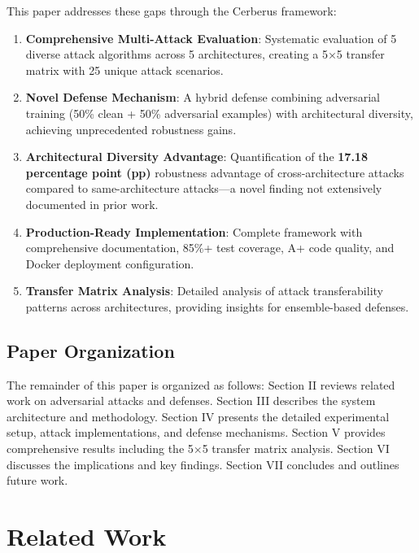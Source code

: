 \documentclass[10pt,conference]{IEEEtran}
\begin{document}
This paper addresses these gaps through the Cerberus framework:

\begin{enumerate}
    \item \textbf{Comprehensive Multi-Attack Evaluation}: Systematic evaluation of 5 diverse attack algorithms across 5 architectures, creating a 5×5 transfer matrix with 25 unique attack scenarios.
    
    \item \textbf{Novel Defense Mechanism}: A hybrid defense combining adversarial training (50\% clean + 50\% adversarial examples) with architectural diversity, achieving unprecedented robustness gains.
    
    \item \textbf{Architectural Diversity Advantage}: Quantification of the \textbf{17.18 percentage point (pp)} robustness advantage of cross-architecture attacks compared to same-architecture attacks—a novel finding not extensively documented in prior work.
    
    \item \textbf{Production-Ready Implementation}: Complete framework with comprehensive documentation, 85\%+ test coverage, A+ code quality, and Docker deployment configuration.
    
    \item \textbf{Transfer Matrix Analysis}: Detailed analysis of attack transferability patterns across architectures, providing insights for ensemble-based defenses.
\end{enumerate}

\subsection{Paper Organization}

The remainder of this paper is organized as follows: Section II reviews related work on adversarial attacks and defenses. Section III describes the system architecture and methodology. Section IV presents the detailed experimental setup, attack implementations, and defense mechanisms. Section V provides comprehensive results including the 5×5 transfer matrix analysis. Section VI discusses the implications and key findings. Section VII concludes and outlines future work.

\section{Related Work}
\end{document}
